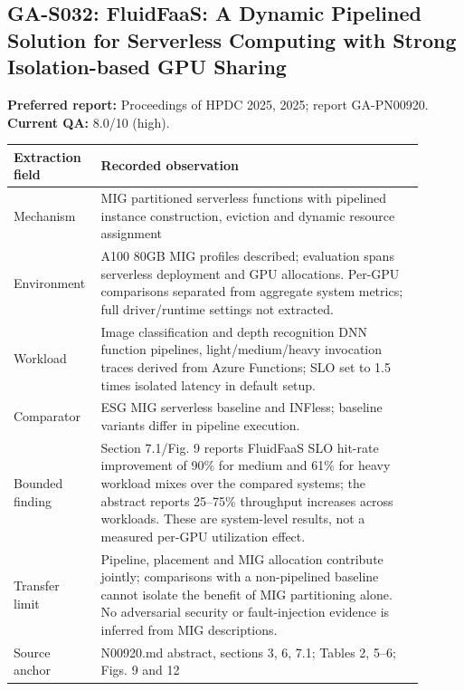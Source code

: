 \subsection{GA-S032: FluidFaaS: A Dynamic Pipelined Solution for Serverless Computing with Strong Isolation-based GPU Sharing}
\textbf{Preferred report:} Proceedings of HPDC 2025, 2025; report GA-PN00920. \textbf{Current QA:} 8.0/10 (high).
\begin{longtable}{P{0.15\linewidth}P{0.75\linewidth}}
\toprule Extraction field & Recorded observation\\\midrule\endhead
Mechanism & MIG partitioned serverless functions with pipelined instance construction, eviction and dynamic resource assignment\\
Environment & A100 80GB MIG profiles described; evaluation spans serverless deployment and GPU allocations. Per-GPU comparisons separated from aggregate system metrics; full driver/runtime settings not extracted.\\
Workload & Image classification and depth recognition DNN function pipelines, light/medium/heavy invocation traces derived from Azure Functions; SLO set to 1.5 times isolated latency in default setup.\\
Comparator & ESG MIG serverless baseline and INFless; baseline variants differ in pipeline execution.\\
Bounded finding & Section 7.1/Fig. 9 reports FluidFaaS SLO hit-rate improvement of 90\% for medium and 61\% for heavy workload mixes over the compared systems; the abstract reports 25–75\% throughput increases across workloads. These are system-level results, not a measured per-GPU utilization effect.\\
Transfer limit & Pipeline, placement and MIG allocation contribute jointly; comparisons with a non-pipelined baseline cannot isolate the benefit of MIG partitioning alone. No adversarial security or fault-injection evidence is inferred from MIG descriptions.\\
Source anchor & N00920.md abstract, sections 3, 6, 7.1; Tables 2, 5–6; Figs. 9 and 12\\
\bottomrule\end{longtable}
